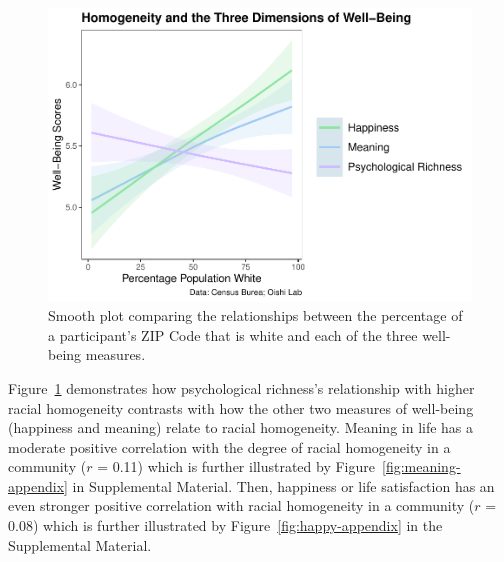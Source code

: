 \documentclass[
  man,floatsintext]{apa7}
\begin{document}
\begin{figure}[H]
\includegraphics[width=1\linewidth]{Richness-Diversity-Markdown_files/figure-latex/d-path-smooth-1} \caption{Smooth plot comparing the relationships between the percentage of a participant's ZIP Code that is white and each of the three well-being measures.}\label{fig:d-path-smooth}
\end{figure}

Figure~\ref{fig:d-path-smooth} demonstrates how psychological richness's relationship with higher racial homogeneity contrasts with how the other two measures of well-being (happiness and meaning) relate to racial homogeneity. Meaning in life has a moderate positive correlation with the degree of racial homogeneity in a community (\(r\) = 0.11) which is further illustrated by Figure~\ref{fig:meaning-appendix} in Supplemental Material. Then, happiness or life satisfaction has an even stronger positive correlation with racial homogeneity in a community (\(r\) = 0.08) which is further illustrated by Figure~\ref{fig:happy-appendix} in the Supplemental Material.
\end{document}
